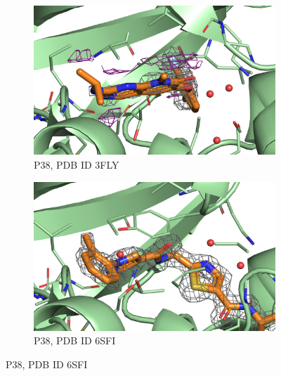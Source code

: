 \documentclass[9pt,bestpractices]{livecoms}
\begin{document}
\begin{figure}
    \centering
    \begin{subfigure}[b]{0.48\textwidth}
        \centering
        \includegraphics[width=\textwidth]{figures/crystal/pic_3fly.png}
        \caption{P38, PDB ID 3FLY}
        \label{fig:3fly}
    \end{subfigure}
    \hfill
    \begin{subfigure}[b]{0.48\textwidth}
        \centering
        \includegraphics[width=\textwidth]{figures/crystal/pic_6sfi.png}
        \caption{P38, PDB ID 6SFI}
        \label{fig:6sfi}
    \end{subfigure}  
    

\end{figure}
\end{document}
